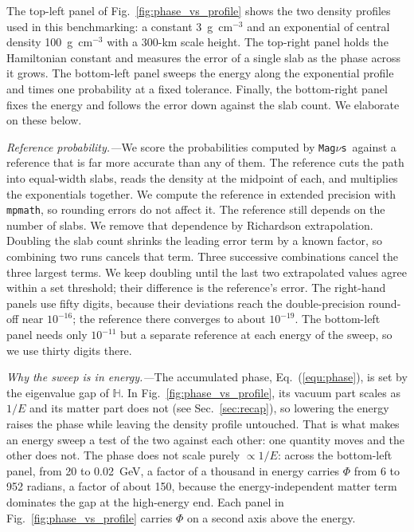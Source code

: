 \documentclass[final,5p,times,twocolumn,sort,compress]{elsarticle}
\makeatletter
\newcommand{\eq}{Eq.}
\newcommand{\fig}{Fig.}
\DeclareRobustCommand{\_}{%
  \ifmmode\nfss@text{\textunderscore}\else\textunderscore\allowbreak\fi}
\newcommand{\equ}[1]{\eq~(\ref{equ:#1})}
\newcommand{\figu}[1]{\fig~\ref{fig:#1}}
\newcommand{\magnus}{{\tt Mag}\ensuremath{\nu}{\tt s}}
\makeatother
\begin{document}
The top-left panel of \figu{phase_vs_profile} shows the two density profiles used in this benchmarking: a constant 3~g~cm$^{-3}$ and an exponential of central density 100~g~cm$^{-3}$ with a 300-km scale height. The top-right panel holds the Hamiltonian constant and measures the error of a single slab as the phase across it grows. The bottom-left panel sweeps the energy along the exponential profile and times one probability at a fixed tolerance. Finally, the bottom-right panel fixes the energy and follows the error down against the slab count. We elaborate on these below.

\smallskip

\textit{Reference probability.---}We score the probabilities computed by \magnus\ against a reference that is far more accurate than any of them. The reference cuts the path into equal-width slabs, reads the density at the midpoint of each, and multiplies the exponentials together. We compute the reference in extended precision with {\tt mpmath}, so rounding errors do not affect it. The reference still depends on the number of slabs. We remove that dependence by Richardson extrapolation. Doubling the slab count shrinks the leading error term by a known factor, so combining two runs cancels that term. Three successive combinations cancel the three largest terms. We keep doubling until the last two extrapolated values agree within a set threshold; their difference is the reference's error. The right-hand panels use fifty digits, because their deviations reach the double-precision round-off near $10^{-16}$; the reference there converges to about $10^{-19}$. The bottom-left panel needs only $10^{-11}$ but a separate reference at each energy of the sweep, so we use thirty digits there.

\smallskip

\textit{Why the sweep is in energy.---}The accumulated phase, \equ{phase}, is set by the eigenvalue gap of $\mathbb{H}$. In \figu{phase_vs_profile}, its vacuum part scales as $1/E$ and its matter part does not (see Sec.~\ref{sec:recap}), so lowering the energy raises the phase while leaving the density profile untouched. That is what makes an energy sweep a test of the two against each other: one quantity moves and the other does not. The phase does not scale purely $\propto 1/E$: across the bottom-left panel, from 20 to 0.02~GeV, a factor of a thousand in energy carries $\Phi$ from 6 to 952 radians, a factor of about 150, because the energy-independent matter term dominates the gap at the high-energy end. Each panel in \figu{phase_vs_profile} carries $\Phi$ on a second axis above the energy.
\end{document}
